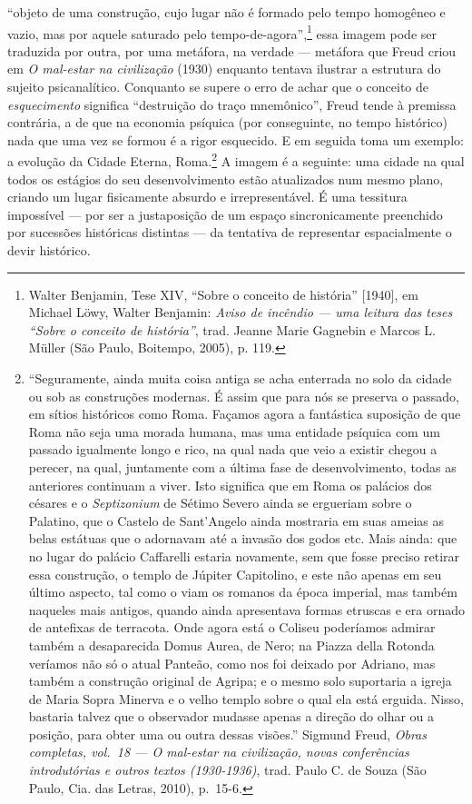 ``objeto de uma construção, cujo lugar não é formado pelo tempo
homogêneo e vazio, mas por aquele saturado pelo
tempo-de-agora'',\footnote{Walter Benjamin, Tese XIV, ``Sobre o conceito
  de história'' {[}1940{]}, em Michael Löwy, Walter Benjamin:
  \textit{Aviso de incêndio --- uma leitura das teses ``Sobre o conceito de
  história''}, trad. Jeanne Marie Gagnebin e Marcos L. Müller (São
  Paulo, Boitempo, 2005), p. 119.} essa imagem pode ser traduzida por
outra, por uma metáfora, na verdade --- metáfora que Freud criou em
\textit{O mal-estar na civilização} (1930) enquanto tentava ilustrar a
estrutura do sujeito psicanalítico. Conquanto se supere o erro de achar
que o conceito de \textit{esquecimento} significa ``destruição do traço
mnemônico'', Freud tende à premissa contrária, a de que na economia
psíquica (por conseguinte, no tempo histórico) nada que uma vez se
formou é a rigor esquecido. E em seguida toma um exemplo: a evolução da
Cidade Eterna, Roma.\footnote{``Seguramente, ainda muita coisa antiga se
  acha enterrada no solo da cidade ou sob as construções modernas. É
  assim que para nós se preserva o passado, em sítios históricos como
  Roma. Façamos agora a fantástica suposição de que Roma não seja uma
  morada humana, mas uma entidade psíquica com um passado igualmente
  longo e rico, na qual nada que veio a existir chegou a perecer, na
  qual, juntamente com a última fase de desenvolvimento, todas as
  anteriores continuam a viver. Isto significa que em Roma os palácios
  dos césares e o \textit{Septizonium} de Sétimo Severo ainda se ergueriam
  sobre o Palatino, que o Castelo de Sant'Angelo ainda mostraria em suas
  ameias as belas estátuas que o adornavam até a invasão dos godos etc.
  Mais ainda: que no lugar do palácio Caffarelli estaria novamente, sem
  que fosse preciso retirar essa construção, o templo de Júpiter
  Capitolino, e este não apenas em seu último aspecto, tal como o viam
  os romanos da época imperial, mas também naqueles mais antigos, quando
  ainda apresentava formas etruscas e era ornado de antefixas de
  terracota. Onde agora está o Coliseu poderíamos admirar também a
  desaparecida Domus Aurea, de Nero; na Piazza della Rotonda veríamos
  não só o atual Panteão, como nos foi deixado por Adriano, mas também a
  construção original de Agripa; e o mesmo solo suportaria a igreja de
  Maria Sopra Minerva e o velho templo sobre o qual ela está erguida.
  Nisso, bastaria talvez que o observador mudasse apenas a direção do
  olhar ou a posição, para obter uma ou outra dessas visões.'' Sigmund
  Freud, \textit{Obras completas, vol.~18 --- O mal-estar na civilização,
  novas conferências introdutórias e outros textos (1930-1936)}, trad.
  Paulo C. de Souza (São Paulo, Cia. das Letras, 2010), p.~15-6.} A
imagem é a seguinte: uma cidade na qual todos os estágios do seu
desenvolvimento estão atualizados num mesmo plano, criando um lugar
fisicamente absurdo e irrepresentável. É uma tessitura impossível --- por
ser a justaposição de um espaço sincronicamente preenchido por sucessões
históricas distintas --- da tentativa de representar espacialmente o
devir histórico.

